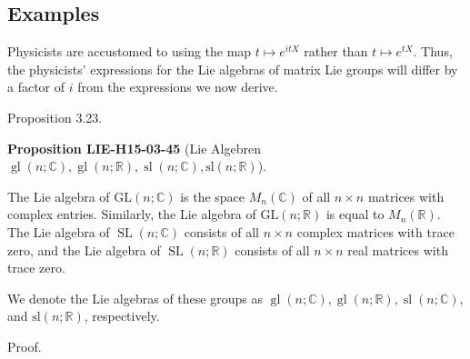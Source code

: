 \documentclass[10pt, letterpaper]{article}
\newcommand{\CustomHeading}[3]{%
  \par\medskip\noindent%
  \textbf{#1 #2} \textnormal{(#3)}.\enskip%
}
\newenvironment{PROP}[2]{\begin{unitbox}\CustomHeading{Proposition}{#1}{#2}}{\end{unitbox}}
\begin{document}
\subsection*{Examples}
Physicists are accustomed to using the map $t \mapsto e^{i t X}$ rather than $t \mapsto e^{t X}$. Thus, the physicists' expressions for the Lie algebras of matrix Lie groups will differ by a factor of $i$ from the expressions we now derive.

Proposition 3.23. 

\begin{PROP}{LIE-H15-03-45}{Lie Algebren $\operatorname{gl}(n ; \mathbb{C}), \operatorname{gl}(n ; \mathbb{R}), \operatorname{sl}(n ; \mathbb{C}), \mathrm{sl}(n ; \mathbb{R})$}
The Lie algebra of $\mathrm{GL}(n ; \mathbb{C})$ is the space $M_{n}(\mathbb{C})$ of all $n \times n$ matrices with complex entries. Similarly, the Lie algebra of $\mathrm{GL}(n ; \mathbb{R})$ is equal to $M_{n}(\mathbb{R})$. The Lie algebra of $\operatorname{SL}(n ; \mathbb{C})$ consists of all $n \times n$ complex matrices with trace zero, and the Lie algebra of $\operatorname{SL}(n ; \mathbb{R})$ consists of all $n \times n$ real matrices with trace zero.

We denote the Lie algebras of these groups as $\operatorname{gl}(n ; \mathbb{C}), \operatorname{gl}(n ; \mathbb{R}), \operatorname{sl}(n ; \mathbb{C})$, and $\mathrm{sl}(n ; \mathbb{R})$, respectively.
\end{PROP}


Proof. 
\end{document}
